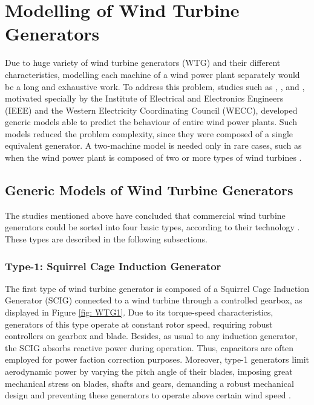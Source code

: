 \chapter{Modelling of Wind Turbine Generators}

\label{ch: Mod}

Due to huge variety of wind turbine generators (WTG) and their different characteristics, modelling each machine of a wind power plant separately would be a long and exhaustive work. To address this problem, studies such as \cite{Muljadi2008}, \cite{Ellis2011}, \cite{council2008wecc} and \cite{Asmine2011}, motivated specially by the Institute of Electrical and Electronics Engineers (IEEE) and the Western Electricity Coordinating Council (WECC), developed generic models able to predict the behaviour of entire wind power plants. Such models reduced the problem complexity, since they were composed of a single equivalent generator. A two-machine model is needed only in rare cases, such as when the wind power plant is composed of two or more types of wind turbines \cite{Ellis2011}.

\section{Generic Models of Wind Turbine Generators}

The studies mentioned above have concluded that commercial wind turbine generators could be sorted into four basic types, according to their technology \cite{Ellis2011}. These types are described in the following subsections.

\subsection{Type-1: Squirrel Cage Induction Generator}

The first type of wind turbine generator is composed of a Squirrel Cage Induction Generator (SCIG) connected to a wind turbine through a controlled gearbox, as displayed in Figure \ref{fig: WTG1}. Due to its torque-speed characteristics, generators of this type operate at constant rotor speed, requiring robust controllers on gearbox and blade. Besides, as usual to any induction generator, the SCIG absorbs reactive power during operation. Thus, capacitors are often employed for power faction correction purposes. Moreover, type-1 generators limit aerodynamic power by varying the pitch angle of their blades, imposing great mechanical stress on blades, shafts and gears, demanding a robust mechanical design and preventing these generators to operate above certain wind speed \cite{Ellis2011}. 

